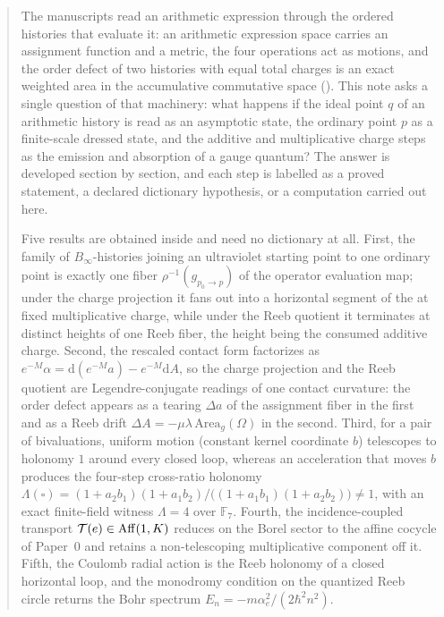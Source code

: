
\begin{abstract}
\noindent
The \AEG{} manuscripts read an arithmetic expression through the ordered
histories that evaluate it: an arithmetic expression space carries an
assignment function and a metric, the four operations act as motions, and the
order defect of two histories with equal total charges is an exact weighted
area in the accumulative commutative space (\ACS).  This note asks a single
question of that machinery: what happens if the ideal point $q$ of an
arithmetic history is read as an asymptotic state, the ordinary point $p$ as a
finite-scale dressed state, and the additive and multiplicative charge steps as
the emission and absorption of a gauge quantum?  The answer is developed
section by section, and each step is labelled as a proved \AEG{} statement, a
declared dictionary hypothesis, or a computation carried out here.

Five results are obtained inside \AEG{} and need no dictionary at all.  First,
the family of $B_\infty$-histories joining an ultraviolet starting point to one
ordinary point is exactly one fiber $\rho^{-1}(g_{p_0\to p})$ of the operator
evaluation map;
under the charge projection it fans out into a horizontal segment of the
\ACS{} at fixed multiplicative charge, while under the Reeb quotient it
terminates at distinct heights of one Reeb fiber, the height being the consumed
additive charge.  Second, the rescaled contact form factorizes as
$e^{-M}\alpha=\mathrm d(e^{-M}a)-e^{-M}\mathrm dA$, so the charge projection and
the Reeb quotient are Legendre-conjugate readings of one contact curvature: the
order defect appears as a tearing $\Delta a$ of the assignment fiber in the
first and as a Reeb drift $\Delta A=-\mu\lambda\,\mathrm{Area}_g(\Omega)$ in the
second.  Third, for a pair of bivaluations, uniform motion (constant kernel
coordinate $b$) telescopes to holonomy $1$ around every closed loop, whereas an
acceleration that moves $b$ produces the four-step cross-ratio holonomy
$\Lambda(\square)=(1+a_2b_1)(1+a_1b_2)\big/\bigl((1+a_1b_1)(1+a_2b_2)\bigr)\neq1$,
with an exact finite-field witness $\Lambda=4$ over $\mathbb F_7$.  Fourth, the
incidence-coupled transport $\mathcal T(e)\in\Aff(1,K)$ reduces on the Borel
sector to the affine cocycle of Paper~0 and retains a non-telescoping
multiplicative component off it.  Fifth, the Coulomb radial action is the Reeb
holonomy of a closed horizontal loop, and the monodromy condition on the
quantized Reeb circle returns the Bohr spectrum
$E_n=-m\alpha_e^2/(2\hbar^2n^2)$.


\end{abstract}
